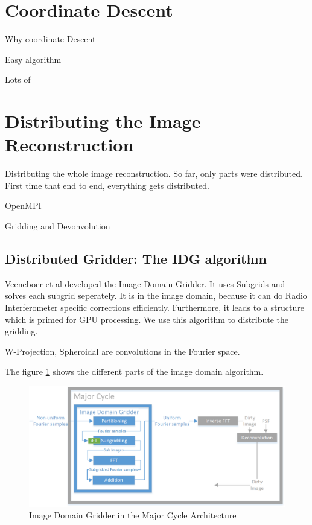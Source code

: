 \section{Coordinate Descent}\label{cd}

Why coordinate Descent

Easy algorithm

Lots of 


\section{Distributing the Image Reconstruction}\label{distribution}
Distributing the whole image reconstruction. So far, only parts were distributed. First time that end to end, everything gets distributed.

OpenMPI

Gridding and Devonvolution

\subsection{Distributed Gridder: The IDG algorithm}\label{distribution:idg}
Veeneboer et al\cite{veenboer2017image} developed the Image Domain Gridder. It uses Subgrids and solves each subgrid seperately.
It is in the image domain, because it can do Radio Interferometer specific corrections efficiently. Furthermore, it leads to a structure which is primed for GPU processing.
We use this algorithm to distribute the gridding.

W-Projection, Spheroidal are convolutions in the Fourier space.

The figure \ref{distribution:idg:system} shows the different parts of the image domain algorithm.

\begin{figure}[h]
	\centering
	\includegraphics[width=0.80\linewidth]{./chapters/03.distribution/idg/major-minor-idg.png}
	\caption{Image Domain Gridder in the Major Cycle Architecture}
	\label{distribution:idg:system}
\end{figure}

